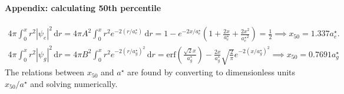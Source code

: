 \documentclass[10pt]{article}
\newcommand{\1}{\mathbf 1}
\begin{document}
\paragraph{Appendix: calculating 50th percentile}

\begin{gather}
	4 \pi \int_0^x
	r^2 |\psi_e|^2
	\,\mathrm{d}r
	=
	4 \pi A^2
	\int_0^x r^2 e^{-2(r/a^\star_e)}
	\,\mathrm{d}r
	=
	1
	-
	e^{-2x/a_e^\star}
	\left(
		1
		+
		\frac{2x}{a_e^\star}
		+
		\frac{2x^2}{{a_e^\star}^2}
	\right)
	=
	\frac{1}{2}
	\implies
	x_\text{50}
	=
	1.337 a_e^\star.
\end{gather}
\begin{gather}
	4 \pi \int_0^x r^2 |\psi_g|^2 \,\mathrm{d}r
	=
	4\pi B^2 
	\int_0^x r^2 e^{-2(r/a_g^\star)^2}
	\,\mathrm{d}r
	=
	\mathrm{erf}\left(
		\frac{\sqrt{2}x}{a_g^\star}
	\right)
	-
	\frac{2x}{a_g^\star}\sqrt{\frac{2}{\pi}}
	e^{-2(x/a_g^\star)^2}
	\implies x_{50} = 0.7691 a_g^\star
\end{gather}
The relations between $x_{50}$ and $a^\star$ are found by converting to dimensionless units $x_{50}/a^\star$ and solving numerically.
\end{document}
